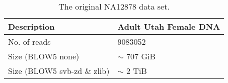 \begin{table}
    \caption{\label{tab:data-orig}The original NA12878 data set.}
    \begin{tabular}{|l|l|}
        \hline
        Description & Adult Utah Female DNA\\
        \hline
	No. of reads & \num{9083052}\\
	Size (BLOW5 none) & $\sim$ 707 GiB\\
	Size (BLOW5 svb-zd \& zlib) & $\sim$ 2 TiB\\
	\hline
    \end{tabular}
\end{table}
